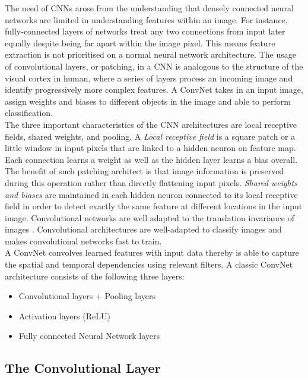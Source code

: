 The need of CNNs arose from the understanding that densely connected neural networks are limited in understanding features within an image. For instance, fully-connected layers of networks treat any two connections from input later equally despite being far apart within the image pixel. This means feature extraction is not prioritised on a normal neural network architecture. The usage of convolutional layers, or patching, in a CNN is analogous to the structure of the visual cortex in human, where a series of layers process an incoming image and identify progressively more complex features. A ConvNet takes in an input image, assign weights and biases to different objects in the image and able to perform classification. \\

The three important characteristics of the CNN architectures are local receptive fields, shared weights, and pooling. A \textit{Local receptive field} is a square patch or a little window in input pixels that are linked to a hidden neuron on feature map. Each connection learns a weight as well as the hidden layer learns a bias overall. The benefit of such patching architect is that image information is preserved during this operation rather than directly flattening input pixels. \textit{Shared weights and biases} are maintained in each hidden neuron connected to its local receptive field in order to detect exactly the same feature at different locations in the input image. Convolutional networks are well adapted to the translation invariance of images \citep{Nielson}. Convolutional architectures are well-adapted to classify images and makes convolutional networks fast to train. \\

A ConvNet convolves learned features with input data thereby is able to capture the spatial and temporal dependencies using relevant filters. A classic ConvNet architecture consists of the following three layers:

\begin{itemize}
    \item Convolutional layers + Pooling layers
    \item Activation layers (ReLU)
    \item Fully connected Neural Network layers
\end{itemize}

\subsection{The Convolutional Layer}

